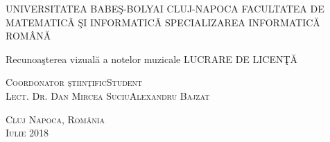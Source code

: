 \begin{titlepage}
	\begin{center}
		\vspace{0.5cm}
		\Large \textsc{UNIVERSITATEA BABEŞ-BOLYAI CLUJ-NAPOCA FACULTATEA DE MATEMATICǍ ŞI INFORMATICǍ 
		SPECIALIZAREA INFORMATICĂ ROMÂNĂ }

		\vfill

		\Huge Recunoaşterea vizuală a notelor muzicale
		\Large LUCRARE DE LICENŢĂ

		\vfill

		\Large
		\textsc{Coordonator ştiinţific}\hfill \textsc{Student}
		\\
		\large
		\textsc{Lect. Dr. Dan Mircea Suciu}\hfill \textsc{Alexandru Bajzat}
	
		\vspace{1.5cm}
		\textsc{Cluj Napoca, România}\\
		\textsc{Iulie 2018}

	\end{center}
\end{titlepage}
 
